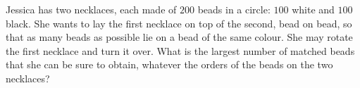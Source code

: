 Jessica has two necklaces, each made of $200$ beads in a circle: $100$ white and $100$ black. She wants to lay the first necklace on top of the second, bead on bead, so that as many beads as possible lie on a bead of the same colour. She may rotate the first necklace and turn it over. What is the largest number of matched beads that she can be sure to obtain, whatever the orders of the beads on the two necklaces?
